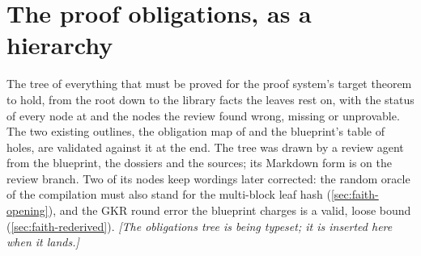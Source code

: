 \chapter{The proof obligations, as a hierarchy}\label{ch:obligations}

The tree of everything that must be proved for the proof system's target theorem to hold,
from the root down to the library facts the leaves rest on, with the status of every node at
 and the nodes the review found wrong, missing or unprovable. The two existing
outlines, the obligation map of  and the blueprint's table of holes,
are validated against it at the end. The tree was drawn by a review agent from the blueprint,
the dossiers and the sources; its Markdown form is  on the review
branch. Two of its nodes keep wordings later corrected: the random oracle of the
compilation must also stand for the multi-block leaf hash (\cref{sec:faith-opening}), and the
GKR round error the blueprint charges is a valid, loose bound (\cref{sec:faith-rederived}).
\ifobligationsready{}\else\emph{[The obligations tree is being typeset; it is inserted here when it lands.]}\fi
